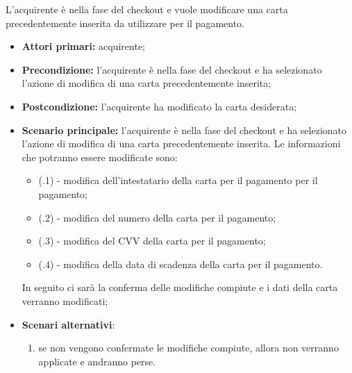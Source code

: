 L'acquirente è nella fase del checkout e vuole modificare una carta precedentemente inserita da utilizzare per il pagamento.
\begin{itemize}
    \item \textbf{Attori primari:} acquirente;
    \item \textbf{Precondizione:} l'acquirente è nella fase del checkout e ha selezionato l'azione di modifica di una carta precedentemente inserita;
    \item \textbf{Postcondizione:} l'acquirente ha modificato la carta desiderata;
    \item \textbf{Scenario principale:} l'acquirente è nella fase del checkout e ha selezionato l'azione di modifica di una carta precedentemente inserita. Le informazioni che potranno essere modificate sono:
    \begin{itemize}
        \item (\actualUC.1) - modifica dell'intestatario della carta per il pagamento per il pagamento;
        \item (\actualUC.2) - modifica del numero della carta per il pagamento;
        \item (\actualUC.3) - modifica del CVV della carta per il pagamento;
        \item (\actualUC.4) - modifica della data di scadenza della carta per il pagamento.
    \end{itemize}
    In seguito ci sarà la conferma delle modifiche compiute e i dati della carta verranno modificati;
    \item \textbf{Scenari alternativi}:
    \begin{enumerate}[label=\lett]
        \item se non vengono confermate le modifiche compiute, allora non verranno applicate e andranno perse.
    \end{enumerate}
\end{itemize}

\resetSubUC

